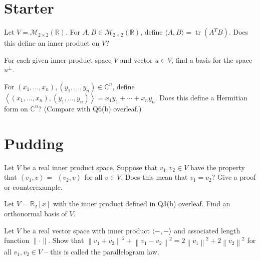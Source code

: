 \documentclass[answers]{exam}
\begin{document}
\section*{Starter}
\begin{questions}

\question%
Let $V=\mathcal{M}_{2 \times 2}(\mathbb{R})$. For $A, B \in \mathcal{M}_{2 \times 2}(\mathbb{R})$, define $\langle A, B\rangle=\operatorname{tr}\left(A^{T} B\right)$. Does this define an inner product on $V$?



\question%
For each given inner product space $V$ and vector $u \in V$, find a basis for the space $u^{\perp}$.



\question%
For $\left(x_{1}, \ldots, x_{n}\right),\left(y_{1}, \ldots, y_{n}\right) \in \mathbb{C}^{n}$, define $\left\langle\left(x_{1}, \ldots, x_{n}\right),\left(y_{1}, \ldots, y_{n}\right)\right\rangle=x_{1} y_{1}+\cdots+x_{n} y_{n}$. Does this define a Hermitian form on $\mathbb{C}^{n}$? (Compare with Q6(b) overleaf.)

\end{questions}



\section*{Pudding}
\begin{questions}

\question%
Let $V$ be a real inner product space. Suppose that $v_{1}, v_{2} \in V$ have the property that $\left\langle v_{1}, v\right\rangle=$ $\left\langle v_{2}, v\right\rangle$ for all $v \in V$. Does this mean that $v_{1}=v_{2}$? Give a proof or counterexample.



\question%
Let $V=\mathbb{R}_{2}[x]$ with the inner product defined in Q3(b) overleaf. Find an orthonormal basis of $V$.



\question%
Let $V$ be a real vector space with inner product $\langle-,-\rangle$ and associated length function $\|\cdot\|$. Show that $\left\|v_{1}+v_{2}\right\|^{2}+\left\|v_{1}-v_{2}\right\|^{2}=2\left\|v_{1}\right\|^{2}+2\left\|v_{2}\right\|^{2}$ for all $v_{1}, v_{2} \in V$ -- this is called the parallelogram law.

\end{questions}
\end{document}

